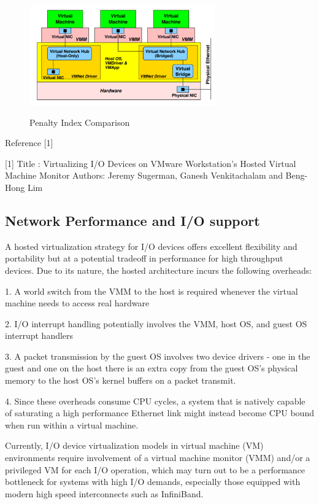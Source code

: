 \documentclass[runningheads]{llncs}
\begin{document}
\begin{figure}[H]
 
      \centering
     \includegraphics[width=80mm,height=50mm]{virtualizing_network_card.png}
     \caption{Penalty Index Comparison}
     \label{fig:galaxy}
  
 \end{figure}
Reference [1]

[1] Title : Virtualizing I/O Devices on VMware Workstation’s Hosted Virtual Machine Monitor
    Authors: Jeremy Sugerman, Ganesh Venkitachalam and Beng-Hong Lim

\subsection{Network Performance and I/O support}
A hosted virtualization strategy for I/O devices offers excellent flexibility and portability but at a potential tradeoff in performance for high throughput devices. Due to its nature, the hosted architecture incurs the following overheads:\newline

1. A world switch from the VMM to the host is required whenever the virtual machine needs to access real hardware

2. I/O interrupt handling potentially involves the VMM, host OS, and guest OS interrupt handlers

3. A packet transmission by the guest OS involves two device drivers - one in the guest and one on the host there is an extra copy from the guest OS’s physical memory to the host OS’s kernel buffers on a packet transmit.

4. Since these overheads consume CPU cycles, a system that is natively capable of saturating a high performance Ethernet link might instead become CPU bound when run within a virtual machine.


\newline
Currently, I/O device virtualization models in virtual machine (VM) environments
require involvement of a virtual machine monitor (VMM) and/or a privileged VM for
each I/O operation, which may turn out to be a performance bottleneck for systems
with high I/O demands, especially those equipped with modern high speed
interconnects such as InfiniBand.
\end{document}
